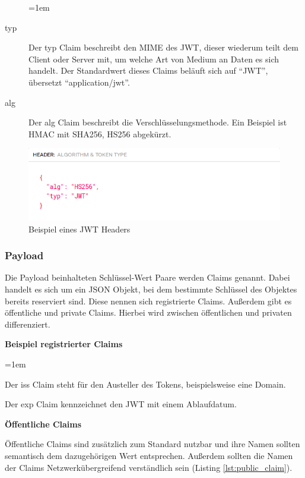 \begin{description}
	\leftskip=1em
	\item[typ] Der typ Claim beschreibt den \gls{MIME} des \gls{JWT}, dieser wiederum teilt dem Client oder Server mit, um welche Art von Medium an Daten es sich handelt. Der Standardwert dieses Claims beläuft sich auf \enquote{JWT}, übersetzt \enquote{application/jwt}.
	\item[alg] Der alg Claim beschreibt die Verschlüsselungsmethode. Ein Beispiel ist \gls{HMAC} mit \gls{SHA256}, HS256 abgekürzt.
\end{description}

\begin{figure}[h]
	\centering
	\includegraphics[width=\textwidth]{graphics/jwt-header.png}
	\caption{Beispiel eines \gls{JWT} Headers }
	\label{fig:jwt-header}
\end{figure}

\subsubsection{Payload}
\label{sec: jwt-payload}

Die Payload beinhalteten Schlüssel-Wert Paare werden Claims genannt. Dabei handelt es sich um ein JSON Objekt, bei dem bestimmte Schlüssel des Objektes bereits reserviert sind. Diese nennen sich registrierte Claims. Au{\ss}erdem gibt es öffentliche und private Claims. Hierbei wird zwischen öffentlichen und privaten differenziert.

\noindent
\textbf{Beispiel registrierter Claims}

\begin{description}
	\leftskip=1em
	\item[iss]
	Der iss Claim steht für den Austeller des Tokens, beispielsweise eine Domain.
	\item[exp] Der exp Claim kennzeichnet den \gls{JWT} mit einem Ablaufdatum.
\end{description}

\noindent
\textbf{Öffentliche Claims}

Öffentliche Claims sind zusätzlich zum Standard nutzbar und ihre Namen sollten semantisch dem dazugehörigen Wert entsprechen. Au{\ss}erdem sollten die Namen der Claims Netzwerkübergreifend verständlich sein (Listing \ref{lst:public_claim}).

